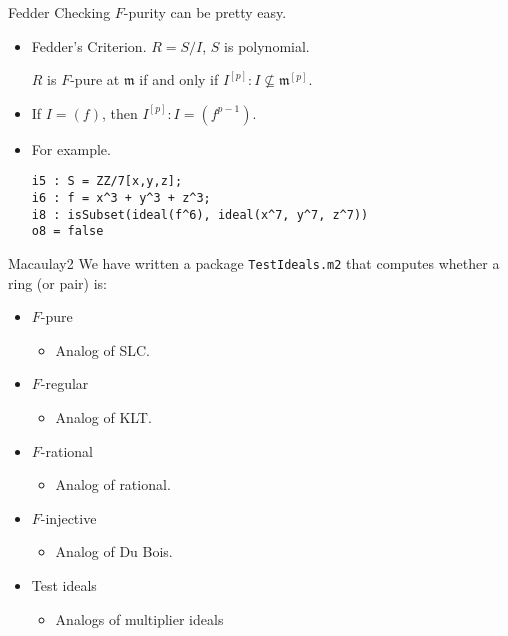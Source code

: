 \documentclass[xcolor=dvipsnames]{beamer}
\theoremstyle{remark}
\begin{document}
\begin{frame}[fragile]{Fedder}
  Checking $F$-purity can be pretty easy.
  \begin{itemize}
    \item<2->  Fedder's Criterion.  $R = S/I$, $S$ is polynomial.
    \begin{theorem}[Fedder]
      $R$ is $F$-pure at $\mathfrak{m}$ if and only if $I^{[p]} : I \not\subseteq \mathfrak{m}^{[p]}$.
    \end{theorem}
   \item<3->  If $I = (f)$, then  $I^{[p]} : I = (f^{p-1})$.
   \item<4->  For example.
   {}
   \begin{verbatim}
i5 : S = ZZ/7[x,y,z];
i6 : f = x^3 + y^3 + z^3;
i8 : isSubset(ideal(f^6), ideal(x^7, y^7, z^7))
o8 = false
   \end{verbatim}
  \end{itemize}
\end{frame}

\begin{frame}[t]{Macaulay2}
  We have written a package {\tt TestIdeals.m2} that computes whether a ring (or pair) is:
  \begin{itemize}
    \item<2->  $F$-pure
    \begin{itemize}
      \item<3->  Analog of SLC.
    \end{itemize}
    \item<4->  $F$-regular
    \begin{itemize}
      \item<5->  Analog of KLT.
    \end{itemize}
    \item<6->  $F$-rational
    \begin{itemize}
      \item<7->  Analog of rational.
    \end{itemize}
    \item<7->  $F$-injective
    \begin{itemize}
      \item<8->  Analog of Du Bois.
    \end{itemize}
    \item<8->  Test ideals
    \begin{itemize}
      \item<9->  Analogs of multiplier ideals
    \end{itemize}
  \end{itemize}
\end{frame}
\end{document}
